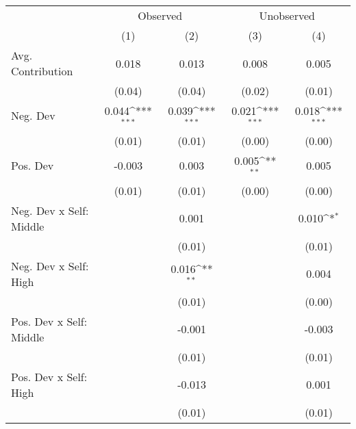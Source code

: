 {
\def\sym#1{\ifmmode^{#1}\else\(^{#1}\)\fi}
\begin{tabular}{l*{4}{c}}
\toprule
                    &\multicolumn{2}{c}{Observed}               &\multicolumn{2}{c}{Unobserved}             \\\cmidrule(lr){2-3}\cmidrule(lr){4-5}
                    &\multicolumn{1}{c}{(1)}         &\multicolumn{1}{c}{(2)}         &\multicolumn{1}{c}{(3)}         &\multicolumn{1}{c}{(4)}         \\
\midrule
Avg. Contribution   &       0.018         &       0.013         &       0.008         &       0.005         \\
                    &      (0.04)         &      (0.04)         &      (0.02)         &      (0.01)         \\
Neg. Dev            &       0.044\sym{***}&       0.039\sym{***}&       0.021\sym{***}&       0.018\sym{***}\\
                    &      (0.01)         &      (0.01)         &      (0.00)         &      (0.00)         \\
Pos. Dev            &      -0.003         &       0.003         &       0.005\sym{**} &       0.005         \\
                    &      (0.01)         &      (0.01)         &      (0.00)         &      (0.00)         \\
Neg. Dev x Self: Middle&                     &       0.001         &                     &       0.010\sym{*}  \\
                    &                     &      (0.01)         &                     &      (0.01)         \\
Neg. Dev x Self: High&                     &       0.016\sym{**} &                     &       0.004         \\
                    &                     &      (0.01)         &                     &      (0.00)         \\
Pos. Dev x Self: Middle&                     &      -0.001         &                     &      -0.003         \\
                    &                     &      (0.01)         &                     &      (0.01)         \\
Pos. Dev x Self: High&                     &      -0.013         &                     &       0.001         \\
                    &                     &      (0.01)         &                     &      (0.01)         \\

\end{tabular}}
